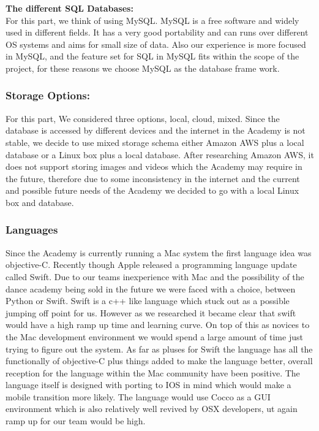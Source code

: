 \textbf{The different SQL Databases:}\\
For this part, we think of using MySQL. MySQL is a free software and widely used in different fields. It has a very good portability and can runs over different OS systems and aims for small size of data. Also our experience is more focused in MySQL, and the feature set for SQL in MySQL fits within the scope of the project, for these reasons we choose MySQL as the database frame work.

\subsubsection{Storage Options:}
For this part, We considered three options, local, cloud, mixed. Since the database is accessed by different devices and the internet in the Academy is not stable, we decide to use mixed storage schema either Amazon AWS plus a local database or a Linux box plus a local database. After researching Amazon AWS, it does not support storing images and videos which the Academy may require in the future, therefore   due to some inconsistency in the internet and the current and possible future needs of the Academy we decided to go with a local Linux box and database.\\

\subsubsection{Languages}
Since the Academy is currently running a Mac system the first language idea was objective-C. Recently though Apple released a programming language update called Swift. Due to our teams inexperience with Mac and the possibility of the dance academy being sold in the future we were faced with a choice, between Python or Swift. Swift is a c++ like language which stuck out as a possible jumping off point for us. However as we researched it became clear that swift would have a high ramp up time and learning curve. On top of this as novices to the Mac development environment we would spend a large amount of time just trying to figure out the system. As far as pluses for Swift the language has all the functionally of objective-C plus things added to make the language better, overall reception for the language within the Mac community have been positive. The language itself is designed with porting to IOS in mind which would make a mobile transition more likely. The language would use Cocco as a GUI environment which is also relatively well revived by OSX developers, ut again ramp up for our team would be high.

